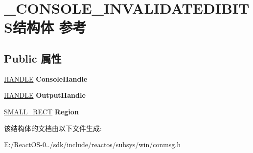 \hypertarget{struct___c_o_n_s_o_l_e___i_n_v_a_l_i_d_a_t_e_d_i_b_i_t_s}{}\section{\+\_\+\+C\+O\+N\+S\+O\+L\+E\+\_\+\+I\+N\+V\+A\+L\+I\+D\+A\+T\+E\+D\+I\+B\+I\+T\+S结构体 参考}
\label{struct___c_o_n_s_o_l_e___i_n_v_a_l_i_d_a_t_e_d_i_b_i_t_s}
\subsection*{Public 属性}
\begin{DoxyCompactItemize}
\item 
\mbox{\label{struct___c_o_n_s_o_l_e___i_n_v_a_l_i_d_a_t_e_d_i_b_i_t_s_a1b697bcac415067f644cfc755c2a5002}} 
\hyperlink{interfacevoid}{H\+A\+N\+D\+LE} {\bfseries Console\+Handle}
\item 
\mbox{\label{struct___c_o_n_s_o_l_e___i_n_v_a_l_i_d_a_t_e_d_i_b_i_t_s_ab03663376647644ba87bdffb6939132a}} 
\hyperlink{interfacevoid}{H\+A\+N\+D\+LE} {\bfseries Output\+Handle}
\item 
\mbox{\label{struct___c_o_n_s_o_l_e___i_n_v_a_l_i_d_a_t_e_d_i_b_i_t_s_a563f1d43ba1493406f494d5c8b04584e}} 
\hyperlink{structtag_s_m_a_l_l___r_e_c_t}{S\+M\+A\+L\+L\+\_\+\+R\+E\+CT} {\bfseries Region}
\end{DoxyCompactItemize}


该结构体的文档由以下文件生成\+:\begin{DoxyCompactItemize}
\item 
E\+:/\+React\+O\+S-\/0../sdk/include/reactos/subsys/win/conmsg.\+h\end{DoxyCompactItemize}
